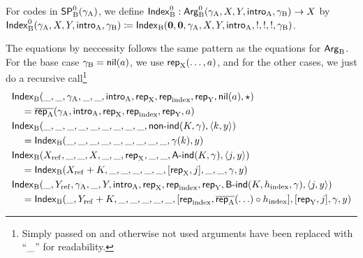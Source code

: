 \documentclass{schwicht}
\begin{document}
For codes in $\SPBp(\gammaA)$, we define $\IndexBp : \ArgBp(\gammaA,
\A, \B, \introA, \gammaB) \to \A$ by $\IndexBp(\gammaA, \A, \B,
\introA, \gammaB) \coloneqq \IndexB(\zero, \zero, \gammaA, \A, \B,
\introA, \magicOmit{\A}, \magicOmit{\A}, \magicOmit{\B \circ
  \magicOmit{\A}}, \gammaB)$.

The equations by neccessity follows the same pattern as the equations
for $\ArgB$. For the base case $\gammaB = \nilB(a)$, we use
$\repA(\ldots, a)$, and for the other cases, we just do a recursive
call\footnote{Simply passed on and otherwise not used arguments have
  been replaced with ``$\omitt$'' for readability.}
%
\begin{align*} 
&  \IndexB(\omitt, \omitt, \gammaA, \omitt, \omitt, \introA, \repA, \repIndex, \repB, \nilB(a), \oneelt) \\
&\quad= \repAbar(\gammaA, \introA, \repA, \repIndex, \repB, a) \\
&  \IndexB(\omitt, \omitt, \omitt, \omitt, \omitt, \omitt, \omitt, \omitt, \omitt, \nonindB(K, \gamma), \pair{k}{y}) \\
&\quad= \IndexB(\omitt, \omitt, \omitt, \omitt, \omitt, \omitt, \omitt, \omitt, \omitt, \gamma(k), y) \\
&  \IndexB(\Xref, \omitt, \omitt, \A, \omitt, \omitt, \repA, \omitt, \omitt, \AindB(K, \gamma), \pair{j}{y}) \\
&\quad=  \IndexB(\Xref + K, \omitt, \omitt, \omitt, \omitt, \omitt,  [\repA, j], \omitt, \omitt, \gamma, y) \\
&  \IndexB(\omitt, \Yref, \gammaA, \omitt, \B, \introA, \repA, \repIndex, \repB, \BindB(K, \hindex, \gamma), \pair{j}{y}) \\
& \quad=   \IndexB(\omitt, \Yref + K, \omitt, \omitt, \omitt, \omitt, \omitt, [\repIndex, \repAbar(\ldots) \circ \hindex], [\repB, j], \gamma, y)
\end{align*}
\end{document}
